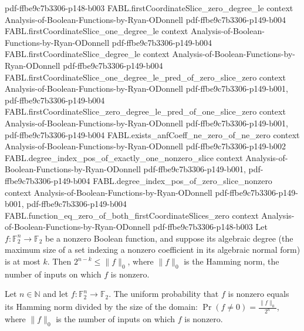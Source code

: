 \begin{theorem}
  {pdf-ffbe9c7b3306-p148-b003}
\proofstep
  {FABL.firstCoordinateSlice_zero_degree_le}
  {context}
  {Analysis-of-Boolean-Functions-by-Ryan-ODonnell}
  {pdf-ffbe9c7b3306-p149-b004}
\proofstep
  {FABL.firstCoordinateSlice_one_degree_le}
  {context}
  {Analysis-of-Boolean-Functions-by-Ryan-ODonnell}
  {pdf-ffbe9c7b3306-p149-b004}
\proofstep
  {FABL.firstCoordinateSlice_degree_le}
  {context}
  {Analysis-of-Boolean-Functions-by-Ryan-ODonnell}
  {pdf-ffbe9c7b3306-p149-b004}
\proofstep
  {FABL.firstCoordinateSlice_one_degree_le_pred_of_zero_slice_zero}
  {context}
  {Analysis-of-Boolean-Functions-by-Ryan-ODonnell}
  {pdf-ffbe9c7b3306-p149-b001,
    pdf-ffbe9c7b3306-p149-b004}
\proofstep
  {FABL.firstCoordinateSlice_zero_degree_le_pred_of_one_slice_zero}
  {context}
  {Analysis-of-Boolean-Functions-by-Ryan-ODonnell}
  {pdf-ffbe9c7b3306-p149-b001,
    pdf-ffbe9c7b3306-p149-b004}
\proofstep
  {FABL.exists_anfCoeff_ne_zero_of_ne_zero}
  {context}
  {Analysis-of-Boolean-Functions-by-Ryan-ODonnell}
  {pdf-ffbe9c7b3306-p149-b002}
\proofstep
  {FABL.degree_index_pos_of_exactly_one_nonzero_slice}
  {context}
  {Analysis-of-Boolean-Functions-by-Ryan-ODonnell}
  {pdf-ffbe9c7b3306-p149-b001,
    pdf-ffbe9c7b3306-p149-b004}
\proofstep
  {FABL.degree_index_pos_of_zero_slice_nonzero}
  {context}
  {Analysis-of-Boolean-Functions-by-Ryan-ODonnell}
  {pdf-ffbe9c7b3306-p149-b001,
    pdf-ffbe9c7b3306-p149-b004}
\proofstep
  {FABL.function_eq_zero_of_both_firstCoordinateSlices_zero}
  {context}
  {Analysis-of-Boolean-Functions-by-Ryan-ODonnell}
  {pdf-ffbe9c7b3306-p148-b003}
Let $f:\mathbb F_2^n\to\mathbb F_2$ be a nonzero Boolean function, and suppose its
algebraic degree (the maximum size of a set indexing a nonzero coefficient in its
algebraic normal form) is at most $k$. Then $2^{n-k}\le \|f\|_0$, where $\|f\|_0$ is the
Hamming norm, the number of inputs on which $f$ is nonzero.
\end{theorem}

\begin{theorem}
\label{FABL.uniformProbability_ne_zero_eq_hammingNorm_ratio}
\leanok
{}
Let $n\in\mathbb{N}$ and let $f:\mathbb{F}_2^n\to\mathbb{F}_2$. The uniform probability
that $f$ is nonzero equals its Hamming norm divided by the size of the domain:
$\Pr(f\ne0)=\frac{\|f\|_0}{2^n}$, where $\|f\|_0$ is the number of inputs on which $f$
is nonzero.
\end{theorem}

